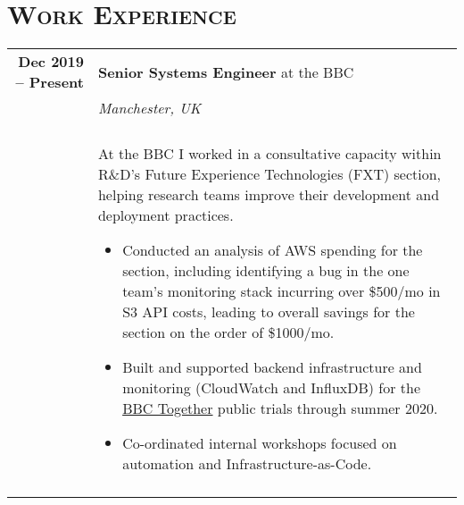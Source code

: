 \documentclass[a4paper,10pt]{article} %
\begin{document}
\section{\textsc{Work Experience}}
\centering
\begin{tabularx}{\textwidth}{r|X}

\textbf{Dec 2019 -- Present}        & \textbf{Senior Systems Engineer} at the BBC \\
                                    & \emph{Manchester, UK} \\
                                    & \\
                                    & \footnotesize
    {At the BBC I worked in a consultative capacity within R\&D's Future
        Experience Technologies (FXT) section, helping research teams improve
        their development and deployment practices.
    \begin{itemize}
        \item Conducted an analysis of AWS spending for the section, including
            identifying a bug in the one team's monitoring stack incurring over
            \$500/mo in S3 API costs, leading to overall savings for the
            section on the order of \$1000/mo.
        \item Built and supported backend infrastructure and monitoring
            (CloudWatch and InfluxDB) for the
            \href{https://www.bbc.co.uk/together}{BBC Together} public trials
            through summer 2020.
        \item Co-ordinated internal workshops focused on automation and
            Infrastructure-as-Code.

    \end{itemize}}\\

\multicolumn{2}{r}{} \\ %


\end{tabularx}
\end{document}
